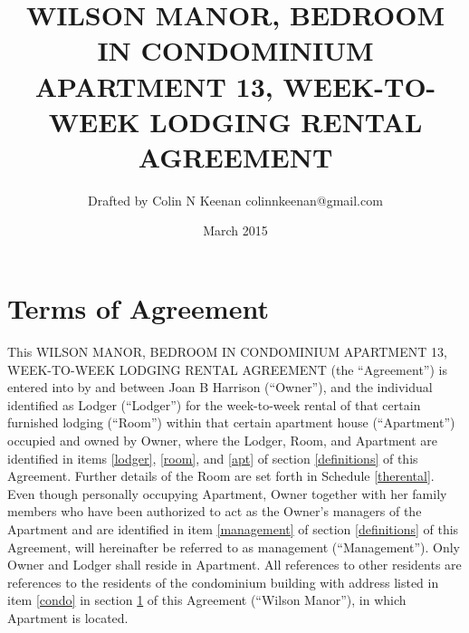\documentclass[12pt,letterpaper]{article}
\newcommand{\agreementtitle}{WILSON MANOR, BEDROOM IN CONDOMINIUM APARTMENT 13, WEEK-TO-WEEK LODGING RENTAL AGREEMENT}
\newcommand{\specifics}{Terms of Agreement}
\newcommand{\mom}{Joan B Harrison}
\newcommand{\management}{Management}
\newcommand{\condo}{Wilson Manor}
\newcommand{\apt}{Apartment}
\newcommand{\room}{Room}
\begin{document}
\title{\agreementtitle{}}
\author{Drafted by Colin N Keenan colinnkeenan@gmail.com}
\date{March 2015}
\maketitle
\thispagestyle{fancy}

\noindent \hrulefill
\section{\specifics{}} \label{specifics}
This \agreementtitle{} (the ``Agreement'') is entered into by and between \mom{} (``Owner''), and the individual identified as Lodger (``Lodger'') for the week-to-week rental of that certain furnished lodging (``\room{}'') within that certain apartment house (``\apt{}'') occupied and owned by Owner, where the Lodger, \room{}, and \apt{} are identified in items \ref{lodger}, \ref{room}, and \ref{apt} of section \ref{definitions} of this Agreement. Further details of the \room{} are set forth in Schedule \ref{therental}. Even though personally occupying \apt{}, Owner together with her family members who have been authorized to act as the Owner's managers of the \apt{} and are identified in item \ref{management} of section \ref{definitions} of this Agreement, will hereinafter be referred to as management (``\management{}''). Only Owner and Lodger shall reside in \apt{}. All references to other residents are references to the residents of the condominium building with address listed in item \ref{condo} in section \ref{specifics} of this Agreement (``\condo{}''), in which \apt{} is located.
\end{document}

